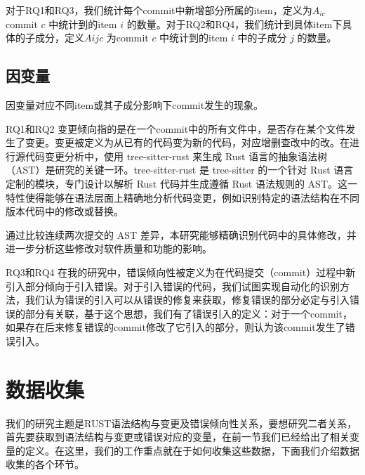 对于RQ1和RQ3，我们统计每个commit中新增部分所属的item，定义为$A_{ic}$ commit $c$ 中统计到的item $i$ 的数量。对于RQ2和RQ4，我们统计到具体item下具体的子成分，定义$A{ijc}$ 为commit $c$ 中统计到的item $i$ 中的子成分 $j$ 的数量。

\subsection{因变量}
\label{sec:dependent-var}
因变量对应不同item或其子成分影响下commit发生的现象。

RQ1和RQ2 变更倾向指的是在一个commit中的所有文件中，是否存在某个文件发生了变更。变更被定义为从已有的代码变为新的代码，对应增删查改中的改。在进行源代码变更分析中，使用 tree-sitter-rust 来生成 Rust 语言的抽象语法树（AST）是研究的关键一环。tree-sitter-rust 是 tree-sitter 的一个针对 Rust 语言定制的模块，专门设计以解析 Rust 代码并生成遵循 Rust 语法规则的 AST。这一特性使得能够在语法层面上精确地分析代码变更，例如识别特定的语法结构在不同版本代码中的修改或替换。

通过比较连续两次提交的 AST 差异，本研究能够精确识别代码中的具体修改，并进一步分析这些修改对软件质量和功能的影响。

RQ3和RQ4 
在我的研究中，错误倾向性被定义为在代码提交（commit）过程中新引入部分倾向于引入错误。对于引入错误的代码，我们试图实现自动化的识别方法，我们认为错误的引入可以从错误的修复来获取，修复错误的部分必定与引入错误的部分有关联，基于这个思想，我们有了错误引入的定义：对于一个commit，如果存在后来修复错误的commit修改了它引入的部分，则认为该commit发生了错误引入。

\section{数据收集}
我们的研究主题是RUST语法结构与变更及错误倾向性关系，要想研究二者关系，首先要获取到语法结构与变更或错误对应的变量，在前一节我们已经给出了相关变量的定义。在这里，我们的工作重点就在于如何收集这些数据，下面我们介绍数据收集的各个环节。

\begin{minipage}{\textwidth}
\begin{parcolumns}{2}


\colplacechunks
\end{parcolumns}
\end{minipage}

